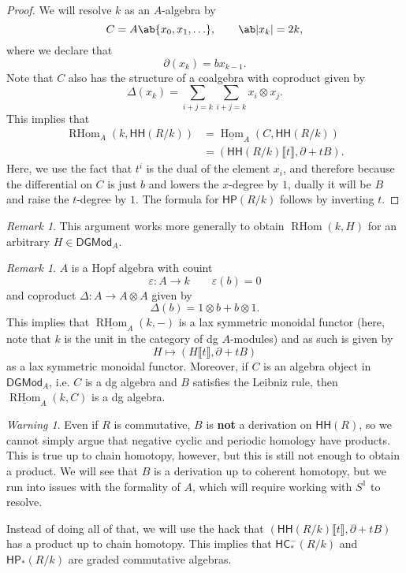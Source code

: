 \documentclass[10pt]{amsart}
\theoremstyle{definition}
\theoremstyle{remark}
\newtheorem{rmk}[thm]{Remark}
\newtheorem{warn}[thm]{Warning}
\theoremstyle{plain}
\theoremstyle{definition}
\theoremstyle{remark}
\newcommand{\ep}{\varepsilon}
\newcommand{\ms}[1]{\mathsf{#1}}
\newcommand{\ul}[1]{\underline{#1}}
\newcommand{\1}{\mathbf{1}}
\newcommand{\2}{\mathbf{2}}
\newcommand{\3}{\mathbf{3}}
\newcommand{\ps}[1]{\llbracket #1 \rrbracket}
\newcommand{\HC}{\ms{HC}}
\newcommand{\HH}{\ms{HH}}
\newcommand{\HP}{\ms{HP}}
\DeclareMathOperator{\Hom}{Hom}
\DeclareMathOperator{\RHom}{RHom}
\begin{document}
\begin{proof}
    We will resolve $k$ as an $A$-algebra by
    \[ C = A\ab\{ x_0, x_1, \ldots\}, \qquad \ab|x_k| = 2k, \]
    where we declare that
    \[ \partial(x_k) = b x_{k-1}. \]
    Note that $C$ also has the structure of a coalgebra with coproduct given by
    \[ \Delta(x_k) = \sum_{i+j = k} \sum_{i+j=k} x_i \otimes x_j. \]
    This implies that
    \begin{align*}
        \RHom_A(k, \HH(R/k)) &= \ul{\Hom}_A(C, \HH(R/k)) \\
        &= (\HH(R/k)\ps{t}, \partial + tB).
    \end{align*}
    Here, we use the fact that $t^i$ is the dual of the element $x_i$, and therefore because the differential on $C$ is just $b$ and lowers the $x$-degree by $1$, dually it will be $B$ and raise the $t$-degree by $1$. The formula for $\HP(R/k)$ follows by inverting $t$.
\end{proof}

\begin{rmk}
    This argument works more generally to obtain $\RHom(k, H)$ for an arbitrary $H \in \ms{DGMod}_A$.
\end{rmk}

\begin{rmk}
    $A$ is a Hopf algebra with couint
    \[ \ep \colon A \to k \qquad \ep(b) = 0 \]
    and coproduct $\Delta \colon A \to A \otimes A$ given by
    \[ \Delta(b) = 1 \otimes b + b \otimes 1. \]
    This implies that $\ul{\RHom}_A(k, -)$ is a lax symmetric monoidal functor (here, note that $k$ is the unit in the category of dg $A$-modules) and as such is given by
    \[ H \mapsto (H \ps{t}, \partial + tB) \]
    as a lax symmetric monoidal functor. Moreover, if $C$ is an algebra object in $\ms{DGMod}_A$, i.e. $C$ is a dg algebra and $B$ satisfies the Leibniz rule, then $\ul{\RHom}_A(k, C)$ is a dg algebra.
\end{rmk}

\begin{warn}
    Even if $R$ is commutative, $B$ is \textbf{not} a derivation on $\HH(R)$, so we cannot simply argue that negative cyclic and periodic homology have products. This is true up to chain homotopy, however, but this is still not enough to obtain a product. We will see that $B$ is a derivation up to coherent homotopy, but we run into issues with the formality of $A$, which will require working with $S^1$ to resolve.

    Instead of doing all of that, we will use the hack that $(\HH(R/k)\ps{t}, \partial + tB)$ has a product up to chain homotopy. This implies that $\HC_*^-(R/k)$ and $\HP_*(R/k)$ are graded commutative algebras.
\end{warn}
\end{document}

